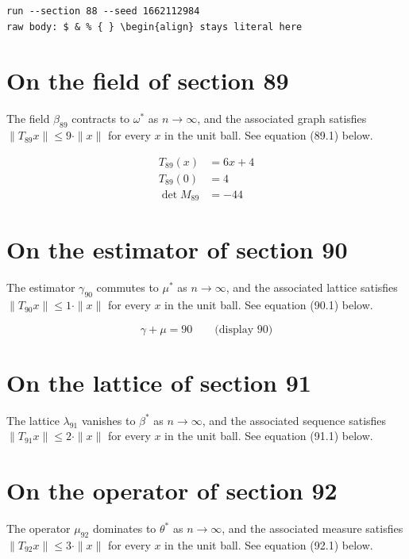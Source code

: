 \documentclass{article}
\begin{document}
\begin{verbatim}
run --section 88 --seed 1662112984
raw body: $ & % { } \begin{align} stays literal here
\end{verbatim}

\section{On the field of section 89}
The field $\beta_{89}$ contracts to $\omega^{*}$ as $n \to \infty$,
and the associated graph satisfies $\|T_{89} x\| \leq 9 \cdot \|x\|$
for every $x$ in the unit ball. See equation (89.1) below.

\begin{align}
T_{89}(x) &= 6 x + 4 \\
T_{89}(0) &= 4 \\
\det M_{89} &= -44
\end{align}

\section{On the estimator of section 90}
The estimator $\gamma_{90}$ commutes to $\mu^{*}$ as $n \to \infty$,
and the associated lattice satisfies $\|T_{90} x\| \leq 1 \cdot \|x\|$
for every $x$ in the unit ball. See equation (90.1) below.

$$
\gamma + \mu = 90 \qquad \text{(display 90)}
$$

\section{On the lattice of section 91}
The lattice $\lambda_{91}$ vanishes to $\beta^{*}$ as $n \to \infty$,
and the associated sequence satisfies $\|T_{91} x\| \leq 2 \cdot \|x\|$
for every $x$ in the unit ball. See equation (91.1) below.

\section{On the operator of section 92}
The operator $\mu_{92}$ dominates to $\theta^{*}$ as $n \to \infty$,
and the associated measure satisfies $\|T_{92} x\| \leq 3 \cdot \|x\|$
for every $x$ in the unit ball. See equation (92.1) below.
\end{document}
